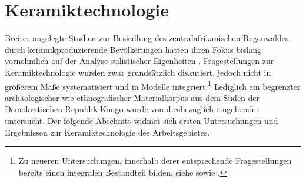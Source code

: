 \chapter{Keramiktechnologie}\label{sec:Herstellung}

Breiter angelegte Studien zur Besiedlung des zentralafrikanischen Regenwaldes durch keramikproduzierende Bevölkerungen hatten ihren Fokus bislang vornehmlich auf der Analyse stilistischer Eigenheiten \parencites[siehe][]{Wotzka.1995}{MbidaMindzie.19951996}{AssokoNdong.20002001}{Clist.20042005}{GouemGouem.20102011}{NlendNlend.20132014}. Fragestellungen zur Keramiktechnologie wurden zwar grundsätzlich diskutiert, jedoch nicht in größerem Maße systematisiert und in Modelle integriert.\footnote{Zu neueren Untersuchungen, innerhalb derer entsprechende Fragestellungen bereits einen integralen Bestandteil bilden, siehe \textcite{Riemer.2011} sowie \textcites{vanDoosselaere.2010}{Mayor.2011}{Gallay.2012}.} Lediglich ein begrenzter archäologischer wie ethnografischer Materialkorpus aus dem Süden der Demokratischen Republik Kongo wurde von \textcite{LivingstoneSmith.2010c} diesbezüglich eingehender untersucht. Der folgende Abschnitt widmet sich ersten Untersuchungen und Ergebnissen zur Keramiktechnologie des Arbeitsgebietes.

